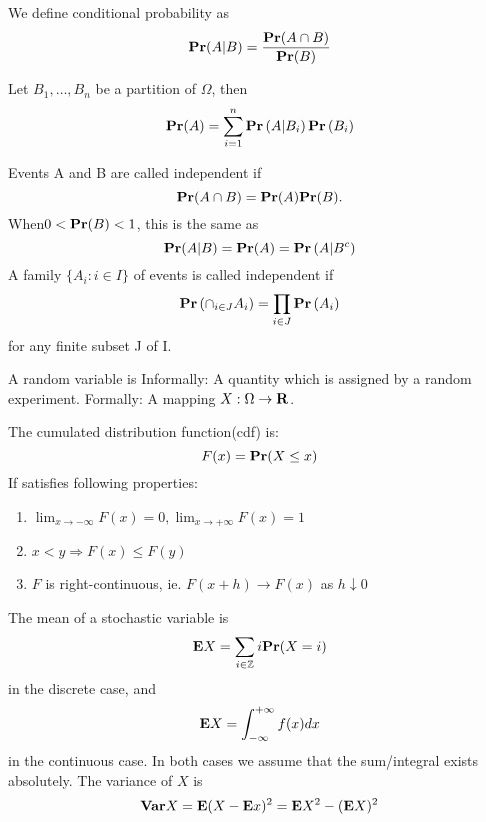 \documentclass[11pt]{article}
\begin{document}
\begin{definition}
We define conditional probability as 
\begin{equation*}
    \mathbf{Pr}(A | B)=\frac{\mathbf{Pr}(A \cap B)}{\mathbf{Pr}(B)}
\end{equation*}
\end{definition}
\begin{theorem}
Let $B_{1}, \dots, B_{n}$ be a partition of $\Omega$, then
\begin{equation}
\mathbf{Pr}(A)=\sum_{i=1}^{n} \mathbf{Pr}\left(A | B_{i}\right) \mathbf{Pr}\left(B_{i}\right)
\end{equation}
\end{theorem}
\begin{definition}
Events A and B are called independent if
\begin{equation}
\mathbf{Pr}(A \cap B)=\mathbf{Pr}(A) \mathbf{Pr}(B).
\end{equation}
When$ 0 < \mathbf{Pr}(B) < 1$, this is the same as
\begin{equation}
\mathbf{Pr}(A | B)=\mathbf{Pr}(A)=\mathbf{Pr}\left(A | B^{c}\right)
\end{equation}
A family $\{A_i : i \in I\}$ of events is called independent if
\begin{equation}
\mathbf{Pr}\left(\cap_{i \in J} A_{i}\right)=\prod_{i \in J} \mathbf{Pr}\left(A_{i}\right)
\end{equation}
for any finite subset J of I.
\end{definition}

\begin{definition}
A random variable is
Informally: A quantity which is assigned by a random experiment.
Formally: A mapping $X : \Omega \rightarrow \mathbf{R}$.
\end{definition}
\begin{definition}
The cumulated distribution function(cdf) is:
\begin{equation}
F(x)=\mathbf{Pr}(X \leq x)
\end{equation}
If satisfies following properties:
\begin{enumerate}
    \item $\lim _{x \rightarrow-\infty} F(x)=0, \lim _{x \rightarrow+\infty} F(x)=1$
    \item $x<y \Rightarrow F(x) \leq F(y)$
    \item $F$ is right-continuous, ie. $F(x+h) \rightarrow F(x)$ as $h \downarrow 0$
\end{enumerate}
\end{definition}
\begin{definition}
The mean of a stochastic variable is
$$
\mathbf{E} X=\sum_{i \in \mathbb{Z}} i \mathbf{Pr}(X=i)
$$
in the discrete case, and
$$
\mathbf{E} X=\int_{-\infty}^{+\infty} f(x) d x
$$
in the continuous case. In both cases we assume that the
sum/integral exists absolutely.
The variance of $X$ is
$$
\mathbf{Var} X=\mathbf{E}(X-\mathbf{E} x)^{2}=\mathbf{E} X^{2}-(\mathbf{E} X)^{2}
$$
\end{definition}
\end{document}
